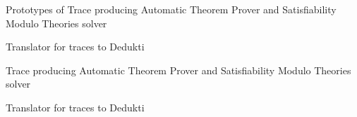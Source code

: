 \begin{workpackage}






\begin{wpdelivs}
  \begin{wpdeliv}[due=6,miles=startup,id=ATPtrace1,dissem=PU,nature=DEM,lead=Inr]
    {Prototypes of Trace producing Automatic Theorem Prover and Satisfiability Modulo Theories solver}
  \end{wpdeliv}

  \begin{wpdeliv}[due=18,miles=startup,id=Trace2Dedukti1,dissem=PU,nature=DEM,lead=Imt]
    {Translator for traces to Dedukti}
  \end{wpdeliv}

  \begin{wpdeliv}[due=48,miles=startup,id=ATPtrace2,dissem=PU,nature=DEM,lead=Inr]
    {Trace producing Automatic Theorem Prover and Satisfiability Modulo Theories solver}
  \end{wpdeliv}

  \begin{wpdeliv}[due=48,miles=startup,id=Trace2Dedukti2,dissem=PU,nature=DEM,lead=Imt]
    {Translator for traces to Dedukti}
  \end{wpdeliv}

\end{wpdelivs}
\end{workpackage}

